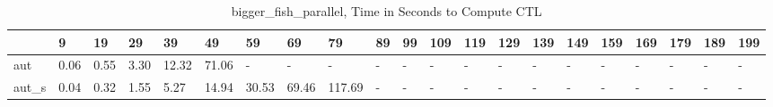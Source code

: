 \begin{table}
\caption{bigger_fish_parallel, Time in Seconds to Compute CTL}
\label{bigger_fish_parallel_CTL_time}
\begin{tabular}{lllllllllllllllllllll}
\toprule
 & 9 & 19 & 29 & 39 & 49 & 59 & 69 & 79 & 89 & 99 & 109 & 119 & 129 & 139 & 149 & 159 & 169 & 179 & 189 & 199 \\
\midrule
aut & 0.06 & 0.55 & 3.30 & 12.32 & 71.06 & - & - & - & - & - & - & - & - & - & - & - & - & - & - & - \\
aut_s & 0.04 & 0.32 & 1.55 & 5.27 & 14.94 & 30.53 & 69.46 & 117.69 & - & - & - & - & - & - & - & - & - & - & - & - \\
\bottomrule
\end{tabular}
\end{table}
